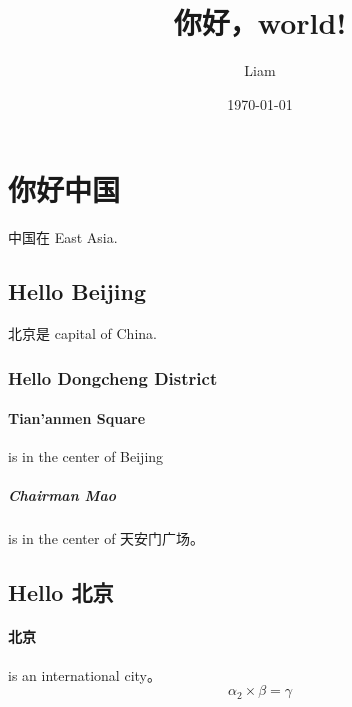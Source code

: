 \documentclass[UTF8]{ctexart}
\title{你好，world!}
\author{Liam}
\date{\today}
\begin{document}
\maketitle
\section{你好中国}
中国在 East Asia.
\subsection{Hello Beijing}
北京是 capital of China.
\subsubsection{Hello Dongcheng District}
\paragraph{Tian'anmen Square}
is in the center of Beijing
\subparagraph{Chairman Mao}
is in the center of 天安门广场。
\subsection{Hello 北京}
\paragraph{北京} is an international city。
\begin{equation}
    \alpha_{2}\times\beta=\gamma
\end{equation}
\end{document}
